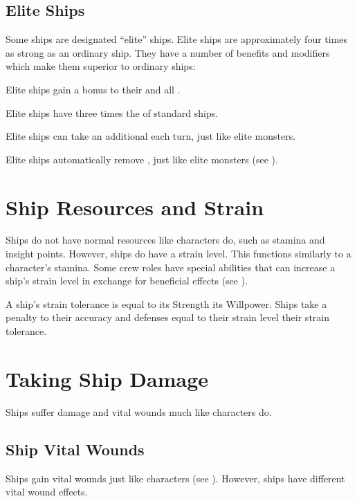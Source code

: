   \subsection{Elite Ships}\label{Elite Ships}
    Some ships are designated ``elite'' ships.
    Elite ships are approximately four times as strong as an ordinary ship.
    They have a number of benefits and modifiers which make them superior to ordinary ships:
    \begin{raggeditemize}
      \item Elite ships gain a  bonus to their  and all .
      \item Elite ships have three times the  of standard ships.
      \item Elite ships can take an additional  each turn, just like elite monsters.
      \item Elite ships automatically remove , just like elite monsters (see ).
    \end{raggeditemize}

\section{Ship Resources and Strain}
  Ships do not have normal resources like characters do, such as stamina and insight points.
  However, ships do have a strain level.
  This functions similarly to a character's stamina.
  Some crew roles have special abilities that can increase a ship's strain level in exchange for beneficial effects (see ).

  A ship's strain tolerance is equal to its Strength \add its Willpower.
  Ships take a penalty to their accuracy and defenses equal to their strain level \sub their strain tolerance.

\section{Taking Ship Damage}
  Ships suffer damage and vital wounds much like characters do.

  \subsection{Ship Vital Wounds}
    Ships gain vital wounds just like characters (see ).
    However, ships have different vital wound effects.

